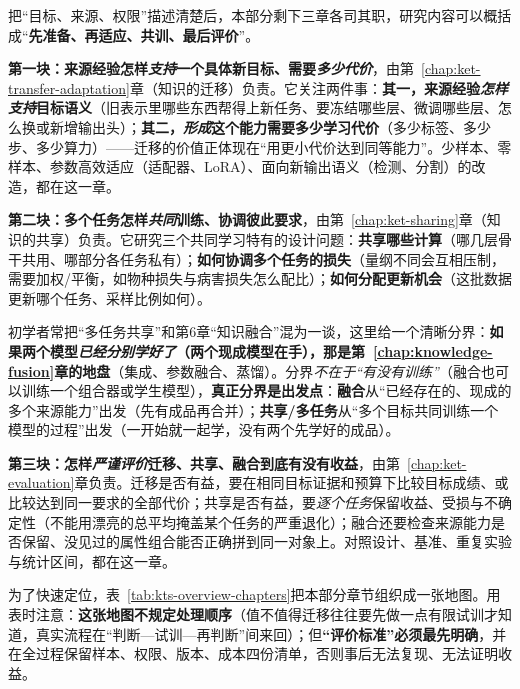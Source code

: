 把“目标、来源、权限”描述清楚后，本部分剩下三章各司其职，研究内容可以概括成“\textbf{先准备、再适应、共训、最后评价}”。

\textbf{第一块：来源经验怎样\emph{支持}一个具体新目标、需要\emph{多少代价}}，由第~\ref{chap:ket-transfer-adaptation}章（知识的迁移）负责。它关注两件事：\textbf{其一，来源经验\emph{怎样支持}目标语义}（旧表示里哪些东西帮得上新任务、要冻结哪些层、微调哪些层、怎么换或新增输出头）；\textbf{其二，\emph{形成}这个能力需要多少学习代价}（多少标签、多少步、多少算力）——迁移的价值正体现在“用更小代价达到同等能力”。少样本、零样本、参数高效适应（适配器、LoRA）、面向新输出语义（检测、分割）的改造，都在这一章。

\textbf{第二块：多个任务怎样\emph{共同}训练、协调彼此要求}，由第~\ref{chap:ket-sharing}章（知识的共享）负责。它研究三个共同学习特有的设计问题：\textbf{共享哪些计算}（哪几层骨干共用、哪部分各任务私有）；\textbf{如何协调多个任务的损失}（量纲不同会互相压制，需要加权/平衡，如物种损失与病害损失怎么配比）；\textbf{如何分配更新机会}（这批数据更新哪个任务、采样比例如何）。

初学者常把“多任务共享”和第6章“知识融合”混为一谈，这里给一个清晰分界：\textbf{如果两个模型\emph{已经分别学好了}（两个现成模型在手），那是第~\ref{chap:knowledge-fusion}章的地盘}（集成、参数融合、蒸馏）。分界\emph{不在于“有没有训练”}（融合也可以训练一个组合器或学生模型），\textbf{真正分界是出发点}：\textbf{融合}从“已经存在的、现成的多个来源能力”出发（先有成品再合并）；\textbf{共享/多任务}从“多个目标共同训练一个模型的过程”出发（一开始就一起学，没有两个先学好的成品）。

\textbf{第三块：怎样\emph{严谨评价}迁移、共享、融合到底有没有收益}，由第~\ref{chap:ket-evaluation}章负责。迁移是否有益，要在相同目标证据和预算下比较目标成绩、或比较达到同一要求的全部代价；共享是否有益，要\emph{逐个任务}保留收益、受损与不确定性（不能用漂亮的总平均掩盖某个任务的严重退化）；融合还要检查来源能力是否保留、没见过的属性组合能否正确拼到同一对象上。对照设计、基准、重复实验与统计区间，都在这一章。

为了快速定位，表~\ref{tab:kts-overview-chapters}把本部分章节组织成一张地图。用表时注意：\textbf{这张地图不规定处理顺序}（值不值得迁移往往要先做一点有限试训才知道，真实流程在“判断—试训—再判断”间来回）；但\textbf{“评价标准”必须最先明确}，并在全过程保留样本、权限、版本、成本四份清单，否则事后无法复现、无法证明收益。

